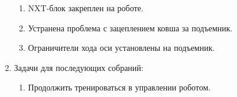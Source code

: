 \begin{enumerate}
\begin{enumerate}
	  \item NXT-блок закреплен на роботе.
	  
      \item Устранена проблема с зацеплением ковша за подъемник.
      
      \item Ограничители хода оси установлены на подъемник.
      
    \end{enumerate}
    
	\item Задачи для последующих собраний:
	\begin{enumerate}
	  \item Продолжить тренироваться в управлении роботом.
	  
    \end{enumerate}     
\end{enumerate}
\fillpage